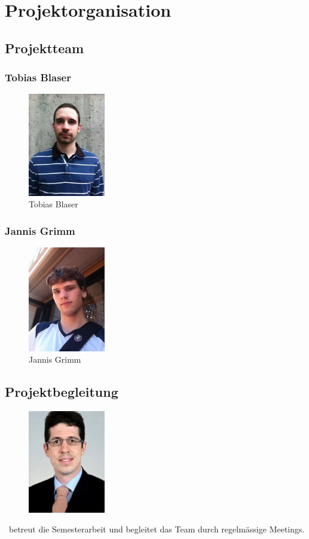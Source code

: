 \chapter{Projektorganisation}

\section{Projektteam}
\subsection*{Tobias Blaser}
\begin{figure}[H]
	\includegraphics[width=0.3\textwidth]{../projektplan/img/tobias.jpg}
	\centering
	\caption{Tobias Blaser}
	\label{fig:tobias}
\end{figure}

\subsection*{Jannis Grimm}
\begin{figure}[H]
	\includegraphics[width=0.3\textwidth]{../projektplan/img/jannis.jpg}
	\centering
	\caption{Jannis Grimm}
	\label{fig:jannis}
\end{figure}

\section{Projektbegleitung}
\begin{figure}[H]
	\includegraphics[width=0.3\textwidth]{../projektplan/img/lblaeser.jpg}
	\centering
	\caption{\teacher}
	\label{fig:bläser}
\end{figure}
\teacher\ betreut die Semesterarbeit und begleitet das Team durch regelmässige Meetings.
